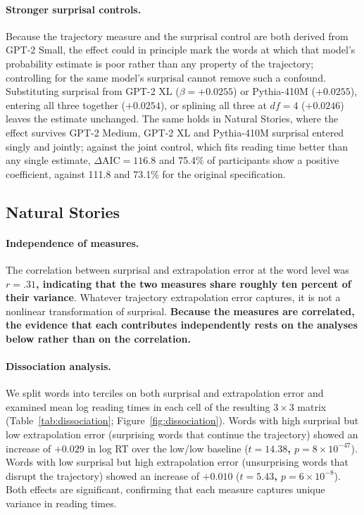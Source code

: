 \documentclass[12pt]{article}
\newcommand{\new}[1]{{\bfseries #1}}
\begin{document}
{\paragraph{Stronger surprisal controls.} Because the trajectory measure and the surprisal control are both derived from GPT-2 Small, the effect could in principle mark the words at which that model's probability estimate is poor rather than any property of the trajectory; controlling for the same model's surprisal cannot remove such a confound. Substituting surprisal from GPT-2 XL ($\beta = +0.0255$) or Pythia-410M ($+0.0255$), entering all three together ($+0.0254$), or splining all three at $df = 4$ ($+0.0246$) leaves the estimate unchanged. The same holds in Natural Stories, where the effect survives GPT-2 Medium, GPT-2 XL and Pythia-410M surprisal entered singly and jointly; against the joint control, which fits reading time better than any single estimate, $\Delta\text{AIC} = 116.8$ and 75.4\% of participants show a positive coefficient, against 111.8 and 73.1\% for the original specification.}

\subsection{Natural Stories}

\paragraph{Independence of measures.} The correlation between surprisal and extrapolation error at the word level was \new{$r = .31$, indicating that the two measures share roughly ten percent of their variance}. Whatever trajectory extrapolation error captures, it is not a nonlinear transformation of surprisal. \new{Because the measures are correlated, the evidence that each contributes independently rests on the analyses below rather than on the correlation.}

\paragraph{Dissociation analysis.} We split words into terciles on both surprisal and extrapolation error and examined mean log reading times in each cell of the resulting $3 \times 3$ matrix (Table~\ref{tab:dissociation}; Figure~\ref{fig:dissociation}). Words with high surprisal but low extrapolation error (surprising words that continue the trajectory) showed an increase of \new{$+0.029$} in log RT over the low/low baseline (\new{$t = 14.38$, $p = 8 \times 10^{-47}$}). Words with low surprisal but high extrapolation error (unsurprising words that disrupt the trajectory) showed an increase of \new{$+0.010$} (\new{$t = 5.43$, $p = 6 \times 10^{-8}$}). Both effects are significant, confirming that each measure captures unique variance in reading times.
\end{document}
